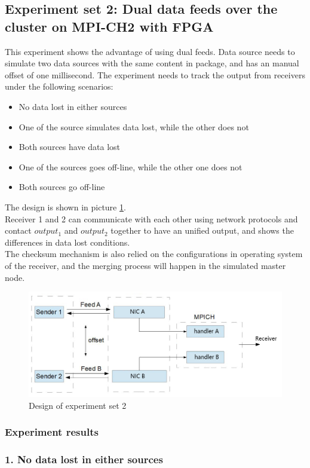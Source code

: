 \documentclass[11pt,openright,a4paper]{report}
\begin{document}
\subsection{Experiment set 2: Dual data feeds over the cluster on MPI-CH2 with FPGA}
This experiment shows the advantage of using dual feeds. Data source needs to simulate two data sources with the same content in package, and has an manual offset of one millisecond. The experiment needs to track the output from receivers under the following scenarios:
\begin{itemize}
	\item No data lost in either sources
	\item One of the source simulates data lost, while the other does not
	\item Both sources have data lost
	\item One of the sources goes off-line, while the other one does not
	\item Both sources go off-line
\end{itemize}
The design is shown in picture \ref{fig:exp3}.\\
Receiver 1 and 2 can communicate with each other using network protocols and contact $output_{1}$ and $output_{2}$ together to have an unified output, and shows the differences in data lost conditions.\\
The checksum mechanism is also relied on the configurations in operating system of the receiver, and the merging process will happen in the simulated master node.\\ 
\begin{figure}[H]
	\centering
	\includegraphics[width=0.8\linewidth]{picture/exp3}
	\caption{Design of experiment set 2}
	\label{fig:exp3}
\end{figure}
\subsubsection{Experiment results}
\subsubsection{1. No data lost in either sources}
\end{document}
